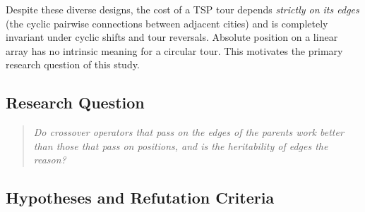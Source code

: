 \documentclass[10pt,a4paper]{article}
\begin{document}
Despite these diverse designs, the cost of a TSP tour depends \emph{strictly on its edges} (the cyclic pairwise connections between adjacent cities) and is completely invariant under cyclic shifts and tour reversals. Absolute position on a linear array has no intrinsic meaning for a circular tour. This motivates the primary research question of this study.

\subsection{Research Question}
\begin{quote}
\textit{Do crossover operators that pass on the edges of the parents work better than those that pass on positions, and is the heritability of edges the reason?}
\end{quote}

\subsection{Hypotheses and Refutation Criteria}
\end{document}
